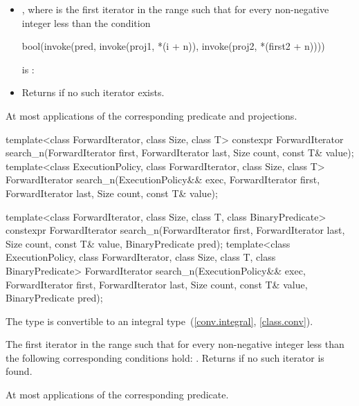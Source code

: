 \begin{itemdescr}
\pnum
\returns
\begin{itemize}
\item
  ,
  where  is
  the first iterator in the range 
  such that
  for every non-negative integer  less than 
  the condition
\begin{codeblock}
bool(invoke(pred, invoke(proj1, *(i + n)), invoke(proj2, *(first2 + n))))
\end{codeblock}
  is :
\item
  Returns  if no such iterator exists.
\end{itemize}

\pnum
\complexity
At most  applications
of the corresponding predicate and projections.
\end{itemdescr}

%
\begin{itemdecl}
template<class ForwardIterator, class Size, class T>
  constexpr ForwardIterator
    search_n(ForwardIterator first, ForwardIterator last,
             Size count, const T& value);
template<class ExecutionPolicy, class ForwardIterator, class Size, class T>
  ForwardIterator
    search_n(ExecutionPolicy&& exec,
             ForwardIterator first, ForwardIterator last,
             Size count, const T& value);

template<class ForwardIterator, class Size, class T,
         class BinaryPredicate>
  constexpr ForwardIterator
    search_n(ForwardIterator first, ForwardIterator last,
             Size count, const T& value,
             BinaryPredicate pred);
template<class ExecutionPolicy, class ForwardIterator, class Size, class T,
         class BinaryPredicate>
  ForwardIterator
    search_n(ExecutionPolicy&& exec,
             ForwardIterator first, ForwardIterator last,
             Size count, const T& value,
             BinaryPredicate pred);
\end{itemdecl}

\begin{itemdescr}

\pnum
\mandates
The type 
is convertible to an integral type~(\ref{conv.integral}, \ref{class.conv}).

\pnum
\returns
The first iterator  in the range 
such that for every non-negative integer  less than 
the following corresponding conditions hold:
.
Returns  if no such iterator is found.

\pnum
\complexity
At most  applications of the corresponding predicate.
\end{itemdescr}

